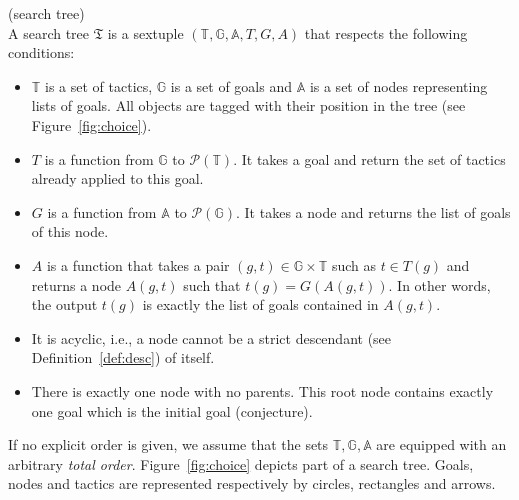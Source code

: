 \documentclass[runningheads,a4paper,draft]{svjour3}
\begin{document}
\begin{definition}\label{def:stree}(search tree)\\
A search tree $\mathfrak{T}$ is a sextuple
$(\mathbb{T},\mathbb{G},\mathbb{A},T,G,A)$
that respects the following conditions:
\begin{itemize}
\item $\mathbb{T}$ is a set of tactics, $\mathbb{G}$ is a set of goals
 and $\mathbb{A}$ is a set of nodes representing lists of goals. All objects
 are tagged with their position in the tree (see Figure~\ref{fig:choice}).
\item $T$ is a function from $\mathbb{G}$ to $\mathcal{P}(\mathbb{T})$. It
takes a goal and return the set of tactics already applied to this goal.
\item $G$ is a function from $\mathbb{A}$ to $\mathcal{P}(\mathbb{G})$.
It takes a node and returns the list of goals of this node.
\item $A$ is a function that takes a pair $(g,t)\in \mathbb{G} \times
\mathbb{T}$ such as $t \in T(g)$ and
returns a node $A(g,t)$ such that $t(g) = G(A(g,t))$. In other words, the output
$t(g)$ is exactly the list of goals contained in $A(g,t)$.
\item It is acyclic, i.e., a node cannot be a strict descendant (see
Definition~\ref{def:desc}) of itself.
\item There is exactly one node with no parents. This root node contains
exactly one goal which is the initial goal (conjecture).
\end{itemize}

\end{definition}

If no explicit order is given, we assume that the sets
$\mathbb{T},\mathbb{G},\mathbb{A}$ are equipped with an
arbitrary \textit{total order}. Figure~\ref{fig:choice} depicts part of a
search tree. Goals, nodes and tactics are represented
respectively by circles, rectangles and arrows.
\end{document}
